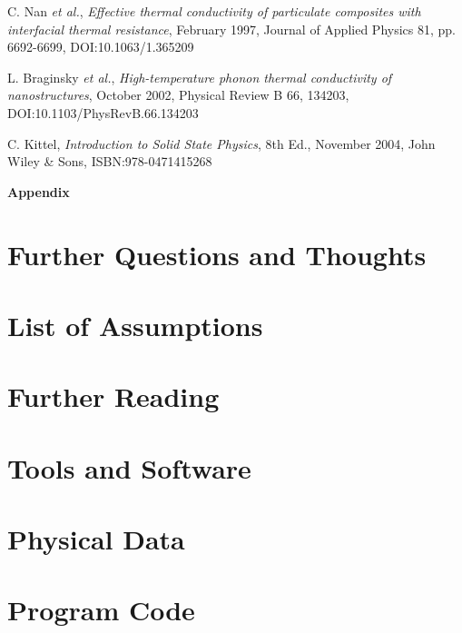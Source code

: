 \documentclass[12pt,draft]{article}
\begin{document}
\begin{thebibliography}{11}
C. Nan \emph{et al.},
\emph{Effective thermal conductivity of particulate composites with interfacial thermal resistance},
February 1997,
Journal of Applied Physics 81, pp. 6692-6699,
DOI:10.1063/1.365209

L. Braginsky \emph{et al.},
\emph{High-temperature phonon thermal conductivity of nanostructures},
October 2002,
Physical Review B 66, 134203,
DOI:10.1103/PhysRevB.66.134203

C. Kittel,
\emph{Introduction to Solid State Physics}, 8th Ed.,
November 2004,
John Wiley \& Sons,
ISBN:978-0471415268

\end{thebibliography}

\pagebreak

\appendix

\begin{center}
{\Huge\textbf{Appendix}}
\end{center}

\section{Further Questions and Thoughts}



\section{List of Assumptions}

\section{Further Reading}

\section{Tools and Software}

\section{Physical Data}

\section{Program Code}
\end{document}
